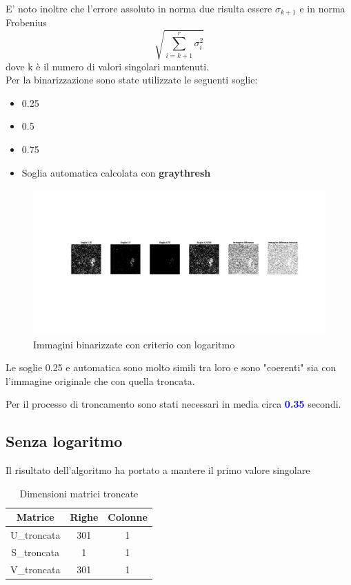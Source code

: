 \noindent
E' noto inoltre che l'errore assoluto in norma due risulta essere $\sigma_{k+1}$ e in norma Frobenius 
\begin{equation}
    \sqrt{\sum_{i=k+1}^{r}\sigma_i^2}
\end{equation}
 dove k è il numero di valori singolari mantenuti.\\
Per la binarizzazione sono state utilizzate le seguenti soglie:
\begin{itemize}
    \item 0.25
    \item 0.5
    \item 0.75
    \item Soglia automatica calcolata con \textbf{graythresh}
\end{itemize}

\begin{figure}[H]
    \centering
     \includegraphics[width=\textwidth]{images/Criterio5.jpg}
    \caption{Immagini binarizzate con criterio con logaritmo}
\end{figure}

\noindent Le soglie 0.25 e automatica sono molto simili tra loro e sono "coerenti" sia con l'immagine originale che con quella troncata.

\noindent Per il processo di troncamento sono stati necessari in media circa \textcolor{blue}{\textbf{0.35}} secondi.\\


\subsection{Senza logaritmo}


\noindent Il risultato dell'algoritmo ha portato a mantere il primo valore singolare
 \begin{table}[H]
    \centering
    \begin{tabular}{|c|c|c|}
        \hline
        \textbf{Matrice} & \textbf{Righe} & \textbf{Colonne} \\
        \hline
        U\_troncata & 301 & 1 \\
        \hline
        S\_troncata & 1 & 1 \\
        \hline
        V\_troncata & 301 & 1 \\
        \hline
    \end{tabular}
    \caption{Dimensioni matrici troncate}
\end{table}

